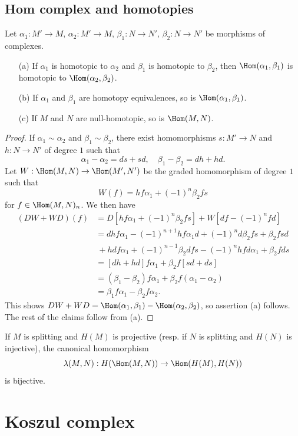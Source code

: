 \subsection{Hom complex and homotopies}
\begin{proposition}\label{module complex Hom preserve homotopy}
Let $\alpha_1:M'\to M$, $\alpha_2:M'\to M$, $\beta_1:N\to N'$, $\beta_2:N\to N'$ be morphisms of complexes.
\begin{itemize}
\item[(a)] If $\alpha_1$ is homotopic to $\alpha_2$ and $\beta_1$ is homotopic to $\beta_2$, then $\Hom(\alpha_1,\beta_1)$ is homotopic to $\Hom(\alpha_2,\beta_2)$.
\item[(b)] If $\alpha_1$ and $\beta_1$ are homotopy equivalences, so is $\Hom(\alpha_1,\beta_1)$.
\item[(c)] If $M$ and $N$ are null-homotopic, so is $\Hom(M,N)$. 
\end{itemize}
\end{proposition}
\begin{proof}
If $\alpha_1\sim\alpha_2$ and $\beta_1\sim\beta_2$, there exist homomorphisms $s:M'\to N$ and $h:N\to N'$ of degree $1$ such that
\[\alpha_1-\alpha_2=ds+sd,\quad \beta_1-\beta_2=dh+hd.\]
Let $W:\Hom(M,N)\to\Hom(M',N')$ be the graded homomorphism of degree $1$ such that
\[W(f)=hf\alpha_1+(-1)^n\beta_2fs\]
for $f\in\Hom(M,N)_n$. We then have
\begin{align*}
(DW+WD)(f)&=D[hf\alpha_1+(-1)^n\beta_2fs]+W[df-(-1)^nfd]\\
&=dhf\alpha_1-(-1)^{n+1}hf\alpha_1d+(-1)^nd\beta_2fs+\beta_2fsd\\
&\ +hdf\alpha_1+(-1)^{n-1}\beta_2dfs-(-1)^nhfd\alpha_1+\beta_2fds\\
&=[dh+hd]f\alpha_1+\beta_2f[sd+ds]\\
&=(\beta_1-\beta_2)f\alpha_1+\beta_2f(\alpha_1-\alpha_2)\\
&=\beta_1f\alpha_1-\beta_2f\alpha_2.
\end{align*}
This shows $DW+WD=\Hom(\alpha_1,\beta_1)-\Hom(\alpha_2,\beta_2)$, so assertion (a) follows. The rest of the claims follow from (a).
\end{proof}
\begin{corollary}
If $M$ is splitting and $H(M)$ is projective (resp. if $N$ is splitting and $H(N)$ is injective), the canonical homomorphism
\[\lambda(M,N):H(\Hom(M,N))\to\Hom(H(M),H(N))\]
is bijective.
\end{corollary}
\section{Koszul complex}
